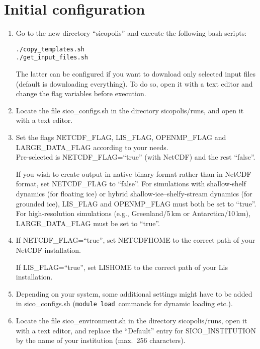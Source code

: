 \documentclass[12pt,a4paper]{article}
\begin{document}


\section{Initial configuration}

\begin{enumerate}

\item Go to the new directory ``sicopolis'' and execute the following bash scripts:

\hspace*{1.5em}\verb+./copy_templates.sh+
\\
\hspace*{1.5em}\verb+./get_input_files.sh+

The latter can be configured if you want to download only selected input files (default is downloading everything). To do so, open it with a text editor and change the flag variables before execution.

\item Locate the file sico\_configs.sh in the directory sicopolis/runs, and open it with a text editor.

\item Set the flags NETCDF\_FLAG, LIS\_FLAG, OPENMP\_FLAG and LARGE\_DATA\_\-FLAG according to your needs.
\\
Pre-selected is NETCDF\_FLAG=``true'' (with NetCDF) and the rest ``false''.

If you wish to create output in native binary format rather than in NetCDF format, set NETCDF\_FLAG to ``false''. For simulations with shallow-shelf dynamics (for floating ice) or hybrid shallow-ice--shelfy-stream dynamics (for grounded ice), LIS\_FLAG and OPENMP\_FLAG must both be set to ``true''. For high-resolution simulations (e.g., Greenland/5\,km or Antarctica/10\,km), LARGE\_DATA\_FLAG must be set to ``true''.

\item If NETCDF\_FLAG=``true'', set NETCDFHOME to the correct path of your NetCDF installation.

If LIS\_FLAG=``true'', set LISHOME to the correct path of your Lis installation.

\item Depending on your system, some additional settings might have to be added in sico\_configs.sh (\verb+module load+\, commands for dynamic loading etc.).

\item Locate the file sico\_environment.sh in the directory sicopolis/runs, open it with a text editor, and replace the ``Default'' entry for SICO\_INSTITUTION by the name of your institution (max.\ 256 characters).

\end{enumerate}
\end{document}
